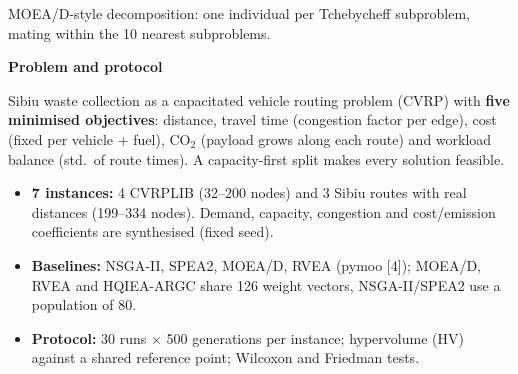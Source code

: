 \documentclass{article}
\newcommand{\smallfont}{\fontsize{23}{29}\selectfont}
\newcommand{\psection}[1]{%
  {\fontsize{46}{54}\selectfont\bfseries #1\par}
  \vspace{5mm}{\color{qblue}\rule{90mm}{2.5mm}}\par\vspace{9mm}}
\newlength{\colw}\setlength{\colw}{\dimexpr(\textwidth-34mm)/2\relax}
\newlength{\bodyh}\setlength{\bodyh}{850mm}
\begin{document}
\begin{minipage}[t][\bodyh][t]{\colw}
\vspace{2mm}
{\smallfont\color{muted} MOEA/D-style decomposition: one individual per Tchebycheff
subproblem, mating within the 10 nearest subproblems.\par}

\vfill
\psection{Problem and protocol}
Sibiu waste collection as a capacitated vehicle routing problem (CVRP) with
\textbf{five minimised objectives}: distance, travel time (congestion factor per edge),
cost (fixed per vehicle + fuel),
CO$_2$ (payload grows along each route) and workload balance (std.\ of route times).
A capacity-first split makes every solution feasible.
\begin{itemize}
  \item \textbf{7 instances:} 4 CVRPLIB (32--200 nodes) and 3 Sibiu routes with real
        distances (199--334 nodes). Demand, capacity, congestion and cost/emission
        coefficients are synthesised (fixed seed).
  \item \textbf{Baselines:} NSGA-II, SPEA2, MOEA/D, RVEA (pymoo [4]); MOEA/D, RVEA and
        HQIEA-ARGC share 126 weight vectors, NSGA-II/SPEA2 use a population of 80.
  \item \textbf{Protocol:} 30 runs $\times$ 500 generations per instance; hypervolume (HV)
        against a shared reference point; Wilcoxon and Friedman tests.
\end{itemize}

\end{minipage}%
\hfill
\end{document}
